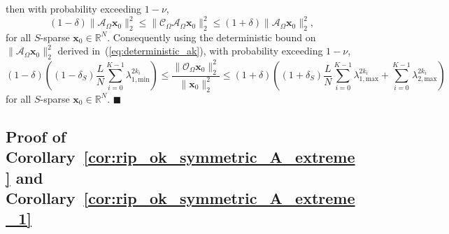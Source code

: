 \documentclass[11pt,draftcls,onecolumn]{IEEEtran}
\def\real    { \mathbb{R} }
\def \ok {{\mathcal{O}_{\Omega}}}
\def \ck {{\mathcal{C}_{\Omega}}}
\def \ak {{\mathcal{A}_{\Omega}}}
\newcommand{\vc}[1]{\boldsymbol{#1}}
\def\real    { \mathbb{R} }
\begin{document}
then with probability exceeding $1-\nu$,
\[
(1-\delta)\|\ak\vc{x}_0\|_2^2 \leq \|\ck\ak\vc{x}_0\|_2^2 \leq (1+\delta)\|\ak\vc{x}_0\|_2^2,
\]
for all $S$-sparse $\vc{x}_0 \in \real^N$. Consequently using the deterministic bound on $\|\ak\vc{x}_0\|_2^2$ derived in~(\ref{eq:deterministic_ak}), with probability exceeding $1-\nu$,
\[
(1-\delta)\left((1-\delta_S)\frac{L}{N}\sum_{i=0}^{K-1}\lambda_{1,\text{min}}^{2k_i}\right) \leq \frac{\|\ok\vc{x}_0\|_2^2}{\|\vc{x}_0\|_2^2} \leq (1+\delta)\left((1+\delta_S)\frac{L}{N}\sum_{i=0}^{K-1}\lambda_{1,\text{max}}^{2k_i} +  \sum_{i=0}^{K-1}\lambda_{2,\text{max}}^{2k_i}\right)
\]
for all $S$-sparse $\vc{x}_0 \in \real^N$. 
\hfill $\blacksquare$






\subsection{Proof of Corollary~\ref{cor:rip_ok_symmetric_A_extreme} and Corollary~\ref{cor:rip_ok_symmetric_A_extreme_1}}
\end{document}
